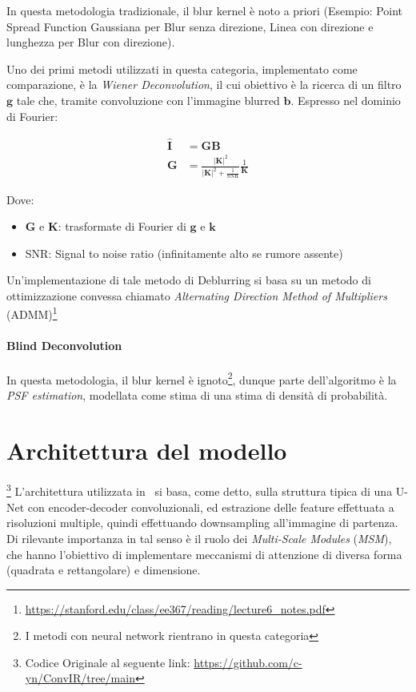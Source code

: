\documentclass[a4paper,10pt,twocolumn]{article}
\begin{document}
In questa metodologia tradizionale, il blur kernel \`e noto a priori (Esempio: Point Spread Function Gaussiana per Blur senza direzione, Linea con direzione e lunghezza per Blur con direzione).\par
Uno dei primi metodi utilizzati in questa categoria, implementato come comparazione, \`e la \textit{Wiener Deconvolution}, il cui obiettivo \`e la ricerca di un filtro $\bm{g}$ tale che, tramite
convoluzione con l'immagine blurred $\bm{b}$. Espresso nel dominio di Fourier:

\begin{align}
  \hat{\bm{I}} &= \bm{G}\bm{B} \\
  \bm{G}       &= \frac{|\bm{K}|^2}{|\bm{K}|^2+\frac{1}{\mathrm{SNR}}} \frac{1}{\bm{K}}
\end{align}

Dove:

\begin{itemize}[topsep=0pt, noitemsep]
  \item[] $\bm{G}$ e $\bm{K}$: trasformate di Fourier di $\bm{g}$ e $\bm{k}$
  \item[] $\mathrm{SNR}$: Signal to noise ratio (infinitamente alto se rumore assente)
\end{itemize}

Un'implementazione di tale metodo di Deblurring si basa su un metodo di ottimizzazione convessa chiamato \textit{Alternating Direction Method of Multipliers} (ADMM)\footnote{\url{https://stanford.edu/class/ee367/reading/lecture6_notes.pdf}}

\paragraph*{Blind Deconvolution}

In questa metodologia, il blur kernel \`e ignoto\footnote{I metodi con neural network rientrano in questa categoria}, dunque parte dell'algoritmo \`e la \textit{PSF estimation}, modellata come
stima di una stima di densit\`a di probabilit\`a.

\section{Architettura del modello}\footnote{Codice Originale al seguente link: \url{https://github.com/c-yn/ConvIR/tree/main}}
L'architettura utilizzata in~\cite{convir} si basa, come detto, sulla struttura tipica di una U-Net con encoder-decoder convoluzionali, ed estrazione delle feature effettuata a risoluzioni multiple, quindi effettuando downsampling all'immagine di partenza.
Di rilevante importanza in tal senso è il ruolo dei \textit{Multi-Scale Modules} (\textit{MSM}), che hanno l'obiettivo di implementare meccanismi di attenzione di diversa forma (quadrata e rettangolare) e dimensione.
\end{document}
